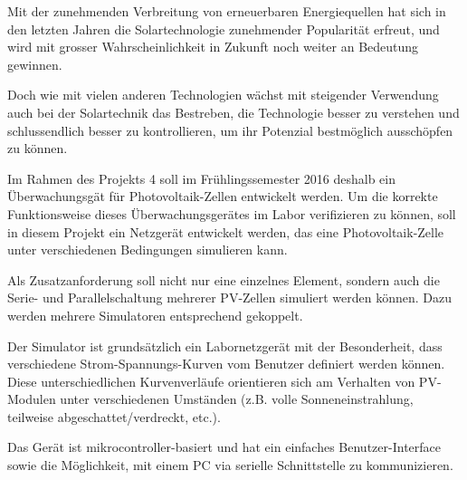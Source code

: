 Mit der  zunehmenden Verbreitung von  erneuerbaren Energiequellen hat  sich in
den letzten Jahren die Solartechnologie zunehmender Popularit\"at erfreut, und
wird  mit  grosser Wahrscheinlichkeit  in  Zukunft  noch weiter  an  Bedeutung
gewinnen.

Doch wie  mit vielen anderen  Technologien w\"achst mit  steigender Verwendung
auch bei der  Solartechnik das Bestreben, die Technologie  besser zu verstehen
und  schlussendlich besser  zu kontrollieren,  um ihr  Potenzial bestm\"oglich
aussch\"opfen zu k\"onnen.

Im  Rahmen  des  Projekts  4  soll im  Fr\"uhlingssemester  2016  deshalb  ein
\"Uberwachungsg\"at  f\"ur   Photovoltaik-Zellen  entwickelt   werden. Um  die
korrekte Funktionsweise  dieses \"Uberwachungsger\"ates im  Labor verifizieren
zu k\"onnen,  soll in  diesem Projekt ein  Netzger\"at entwickelt  werden, das
eine Photovoltaik-Zelle unter verschiedenen Bedingungen simulieren kann.

Als  Zusatzanforderung   soll  nicht  nur  eine   einzelnes  Element,  sondern
auch  die Serie-  und  Parallelschaltung mehrerer  PV-Zellen simuliert  werden
k\"onnen. Dazu werden mehrere Simulatoren entsprechend gekoppelt.

Der Simulator ist grunds\"atzlich  ein Labornetzger\"at  mit der Besonderheit,
dass  verschiedene   Strom-Spannungs-Kurven  vom  Benutzer   definiert  werden
k\"onnen. Diese   unterschiedlichen  Kurvenverl\"aufe   orientieren  sich   am
Verhalten  von   PV-Modulen  unter   verschiedenen  Umst\"anden   (z.B.  volle
Sonneneinstrahlung, teilweise abgeschattet/verdreckt, etc.).

Das   Ger\"at    ist   mikrocontroller-basiert    und   hat    ein   einfaches
Benutzer-Interface  sowie  die  M\"oglichkeit,   mit  einem  PC  via  serielle
Schnittstelle zu kommunizieren.


